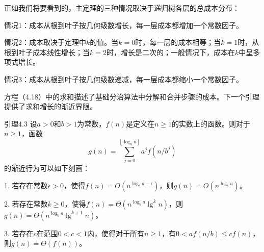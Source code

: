 \documentclass[lang=cn,newtx,10pt,scheme=chinese]{elegantbook}
\begin{document}
正如我们将要看到的，主定理的三种情况取决于递归树各层的总成本分布：

情况1：成本从根到叶子按几何级数增长，每一层成本都增加一个常数因子。

情况2：成本取决于定理中$k$的值。当$k=0$时，每一层的成本相等；当$k=1$时，从根到叶子成本线性增长；当$k=2$时，增长是二次的；一般情况下，成本在$k$中呈多项式增长。

情况3：成本从根到叶子按几何级数递减，每一层成本都缩小一个常数因子。

方程（4.18）中的求和描述了基础分治算法中分解和合并步骤的成本。下一个引理提供了求和增长的渐近界限。

\begin{lemma}{}{}
引理4.3
设$a>0$和$b>1$为常数，$f(n)$是定义在$n\geq1$的实数上的函数。则对于$n\geq1$，函数
$$
g(n)=\sum_{j=0}^{\left\lfloor\log _b n\right\rfloor} a^j f\left(n / b^j\right)
$$
的渐近行为可以如下刻画：

1. 若存在常数$\epsilon>0$，使得$f(n)=O\left(n^{\log _b a-\epsilon}\right)$，则$g(n)=O\left(n^{\log _b a}\right)$。

2. 若存在常数$k \geq 0$，使得$f(n)=\Theta\left(n^{\log _b a} \lg ^k n\right)$，则$g(n)=\Theta\left(n^{\log _b a} \lg ^{k+1} n\right)$。

3. 若存在$c$在范围$0<c<1$内，使得对于所有$n\geq1$，有$0<a f(n / b) \leq c f(n)$，则$g(n)=\Theta(f(n))$。
\end{lemma}
\end{document}
